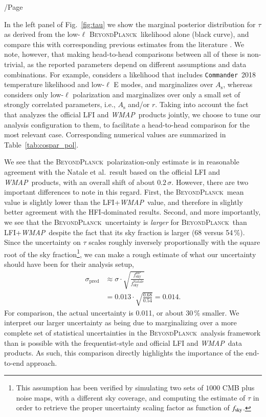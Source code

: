 /Page\documentclass[twocolumn]{aa}
\def\WMAP{\textit{WMAP}}
\def\commander{\texttt{Commander}}
\newcommand{\BP}{\textsc{BeyondPlanck}}
\begin{document}
In the left panel of Fig.~\ref{fig:tau} we show the marginal posterior
distribution for $\tau$ as derived from the low-$\ell$ \BP\ likelihood
alone (black curve), and compare this with corresponding previous
estimates from the literature \citep{hinshaw2012, planck2016-l06,
  natale:2020,pagano:2020}. We note, however, that making head-to-head
comparisons between all of these is non-trivial, as the reported
parameters depend on different assumptions and data combinations. For
example, \citet{pagano:2020} considers a likelihood that includes
\commander\ 2018 temperature likelihood and low-$\ell$ E modes, 
and marginalizes over $A_{\mathrm{s}}$, whereas \citet{natale:2020} considers only
low-$\ell$ polarization and marginalizes over only a small set of
strongly correlated parameters, i.e., $A_{\mathrm{s}}$ and/or
$r$. Taking into account the fact that \citet{natale:2020} analyzes
the official LFI and \WMAP\ products jointly, we choose to tune our
analysis configuration to them, to facilitate a head-to-head
comparison for the most relevant case. Corresponding numerical values
are summarized in Table~\ref{tab:cospar_pol}.

We see that the \BP\ polarization-only estimate is in reasonable
agreement with the Natale et al.\ result based on the official LFI and
\WMAP\ products, with an overall shift of about
$0.2\,\sigma$. However, there are two important differences to note in
this regard. First, the \BP\ mean value is slightly lower than the
LFI+\WMAP\ value, and therefore in slightly better agreement with the
HFI-dominated results. Second, and more importantly, we see that the
\BP\ uncertainty is \emph{larger} for \BP\ than LFI+\WMAP\, despite
the fact that its sky fraction is larger (68 versus 54\,\%). Since the
uncertainty on $\tau$ scales roughly inversely proportionally with the
square root of the sky fraction\footnote{This assumption has been verified
by simulating two sets of $1000$ CMB plus noise maps, with a different
sky coverage, and computing the estimate of $\tau$ in order to retrieve
the proper uncertainty scaling factor as function of $f_{\rm{sky}}$.}, we can
make a rough estimate of what our uncertainty should have been for
their analysis setup,
\begin{align}
  \sigma_{\mathrm{pred}} &\approx
  \sigma\cdot\sqrt{\frac{f_{\mathrm{sky}}^{\mathrm{BP}}}{f_{\mathrm{sky}}^{\mathrm{Natale}}}}\\\
  &= 0.013\cdot \sqrt{\frac{0.68}{0.54}}= 0.014.
\end{align}
For comparison, the actual \citet{natale:2020} uncertainty is 0.011, or about 30\,\%
smaller. We interpret our larger uncertainty as being due to marginalizing over a more
complete set of statistical uncertainties in the \BP\ analysis
framework than is possible with the frequentist-style and official LFI
and \WMAP\ data products. As such, this comparison directly highlights
the importance of the end-to-end approach.
\end{document}
